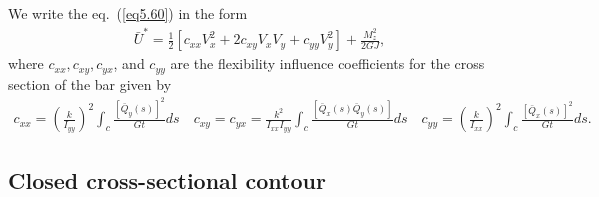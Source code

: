 \documentclass{AeroStructure-ERJohnson}
\begin{document}
We write the eq.~(\ref{eq5.60}) in the form
\begin{align}\label{eq5.61}
\bar{U}^{*}=\frac{1}{2}\left[c_{x x} V_{x}^{2}+2 c_{x y} V_{x} V_{y}+c_{y y} V_{y}^{2}\right]+\frac{M_{z}^{2}}{2 G J},
\end{align}
where $c_{x x}, c_{x y}, c_{y x}$, and $c_{y y}$ are the flexibility influence coefficients for the cross section of the bar given by
\begin{align}\label{eq5.62}
c_{x x}=\left(\frac{k}{I_{y y}}\right)^{2} \int_{c} \frac{\left[\bar{Q}_{y}(s)\right]^{2}}{G t} d s\quad c_{x y}=c_{y x}=\frac{k^{2}}{I_{x x} I_{y y}} \int_{c} \frac{\left[\bar{Q}_{x}(s) \bar{Q}_{y}(s)\right]}{G t} d s\quad c_{y y}=\left(\frac{k}{I_{x x}}\right)^{2} \int_{c} \frac{\left[\bar{Q}_{x}(s)\right]^{2}}{G t} d s.
\end{align}

\subsection{Closed cross-sectional contour}\label{sec5.5.2}
\end{document}
